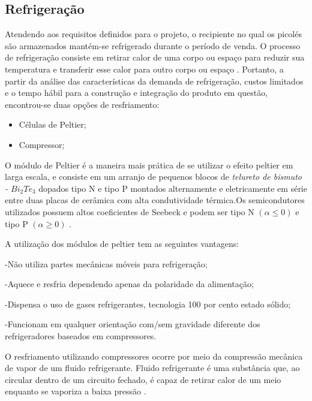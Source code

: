\subsection{Refrigeração}
Atendendo aos requisitos definidos para o projeto, o recipiente no qual os picolés são armazenados  mantém-se refrigerado durante o período de venda. O processo de refrigeração consiste em retirar calor de uma corpo ou espaço para reduzir sua temperatura e transferir esse calor para outro corpo ou espaço \cite{campos2010refrigeraccao}. Portanto, a partir da análise das características da demanda de refrigeração, custos limitados e o tempo hábil para a construção e integração do produto em questão, encontrou-se duas opções de resfriamento:

\begin{itemize}
\item Células de Peltier;
\end{itemize}

\begin{itemize}
\item Compressor;
\end{itemize}

O módulo de Peltier é a maneira mais prática de se utilizar o efeito peltier em larga escala, e consiste em um arranjo de pequenos blocos de \textit{telureto de bismuto - $Bi_{2}Te_{3}$} dopados tipo N e tipo P montados alternamente e eletricamente em série entre duas placas de cerâmica com alta condutividade térmica.Os semicondutores utilizados possuem altos coeficientes de Seebeck e podem ser tipo N $(\alpha \leq 0)$ e tipo P $(\alpha \geq 0)$  \cite{campos2010refrigeraccao}.

A utilização dos módulos de peltier tem as seguintes vantagens:

-Não utiliza partes mecânicas móveis para refrigeração;

-Aquece e resfria dependendo apenas da polaridade da alimentação;

-Dispensa o uso de gases refrigerantes, tecnologia 100 por cento estado sólido;

-Funcionam em qualquer orientação com/sem gravidade diferente dos refrigeradores baseados em compressores.


O resfriamento utilizando compressores ocorre por meio da compressão mecânica de vapor de um fluido refrigerante. Fluido refrigerante é uma substância que, ao circular dentro de um circuito fechado, é capaz de retirar calor de um meio enquanto se vaporiza a baixa pressão \cite{teixeiraconcepccao}.

